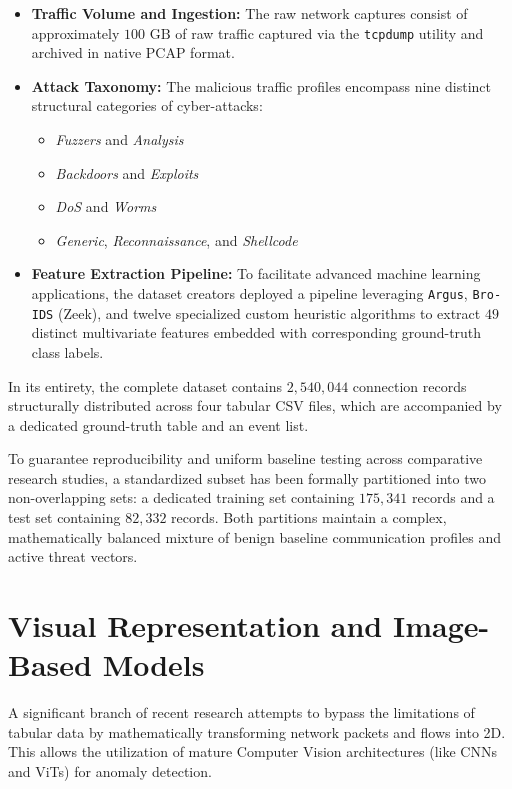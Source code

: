\documentclass[12pt, a4paper]{report}
\begin{document}
\begin{itemize}
    \item \textbf{Traffic Volume and Ingestion:} The raw network captures consist of approximately $100\text{~GB}$ of raw traffic captured via the \texttt{tcpdump} utility and archived in native PCAP format. 
    \item \textbf{Attack Taxonomy:} The malicious traffic profiles encompass nine distinct structural categories of cyber-attacks:
    \begin{itemize}
        \item \textit{Fuzzers} and \textit{Analysis}
        \item \textit{Backdoors} and \textit{Exploits}
        \item \textit{DoS} and \textit{Worms}
        \item \textit{Generic}, \textit{Reconnaissance}, and \textit{Shellcode}
    \end{itemize}
    \item \textbf{Feature Extraction Pipeline:} To facilitate advanced machine learning applications, the dataset creators deployed a pipeline leveraging \texttt{Argus}, \texttt{Bro-IDS} (Zeek), and twelve specialized custom heuristic algorithms to extract $49$ distinct multivariate features embedded with corresponding ground-truth class labels.
\end{itemize}

In its entirety, the complete dataset contains $2,540,044$ connection records structurally distributed across four tabular CSV files, which are accompanied by a dedicated ground-truth table and an event list. 

To guarantee reproducibility and uniform baseline testing across comparative research studies, a standardized subset has been formally partitioned into two non-overlapping sets: a dedicated training set containing $175,341$ records and a test set containing $82,332$ records. Both partitions maintain a complex, mathematically balanced mixture of benign baseline communication profiles and active threat vectors.





\section{Visual Representation and Image-Based Models}
A significant branch of recent research attempts to bypass the limitations of tabular data by mathematically transforming network packets and flows into 2D. This allows the utilization of mature Computer Vision architectures (like CNNs and ViTs) for anomaly detection.
\end{document}
